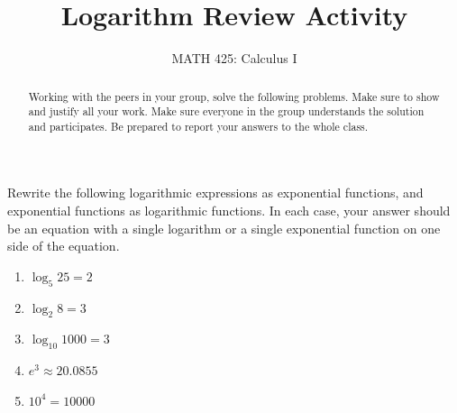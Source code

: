 \documentclass{ximera}
\title{Logarithm Review Activity}
\author{MATH 425: Calculus I}
\begin{document}
\begin{abstract}
   Working with the peers in your group, solve the following problems. Make sure to show and justify all your work. Make sure everyone in the group understands the solution and participates. Be prepared to report your answers to the whole class. 
\end{abstract}
\maketitle

\begin{exercise}
    Rewrite the following logarithmic expressions as exponential functions, and exponential functions as logarithmic functions.  In each case, your answer should be an equation with a single logarithm or a single exponential function on one side of the equation.
    \begin{enumerate}
        \item $\log_5 25=2$
        \item $\log_2 8=3$
        \item $\log_{10} 1000=3$
        \item $e^3\approx 20.0855$
        \item $10^4=10000$
    \end{enumerate}
\end{exercise}


\end{document}
